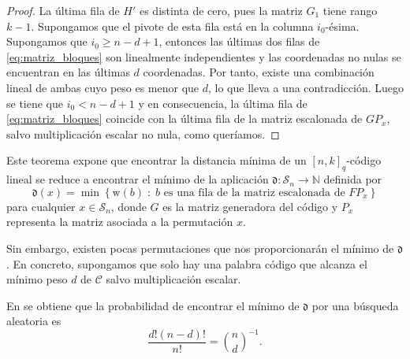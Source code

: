 \begin{proof}
    La última fila de $H'$ es distinta de cero, pues la matriz $G_1$ tiene rango $k-1$. Supongamos que el pivote de esta fila está en la columna $i_0$-ésima. Supongamos que $i_0 \geq n - d + 1$, entonces las últimas dos filas de \eqref{eq:matriz_bloques} son linealmente independientes y las coordenadas no nulas se encuentran en las últimas $d$ coordenadas. Por tanto, existe una combinación lineal de ambas cuyo peso es menor que $d$, lo que lleva a una contradicción. Luego se tiene que $i_0 < n - d + 1$ y en consecuencia, la última fila de \eqref{eq:matriz_bloques} coincide con la última fila de la matriz escalonada de $GP_x$, salvo multiplicación escalar no nula, como queríamos.
\end{proof}

Este teorema expone que encontrar la distancia mínima de un $[n, k]_q$-código lineal se reduce a encontrar el mínimo de la aplicación $\mathfrak d : \mathcal{S}_n \rightarrow \mathbb{N}$ definida por
\[
    \mathfrak d (x) = \min \left\{ \text{w}(b) \; : \; b \text{ es una fila de la matriz escalonada de } FP_x \right\}
\]
para cualquier $x \in \mathcal{S}_n$, donde $G$ es la matriz generadora del código y $P_x$ representa la matriz asociada a la permutación $x$.

Sin embargo, existen pocas permutaciones que nos proporcionarán el mínimo de $\mathfrak{d}$. En concreto, supongamos que solo hay una palabra código que alcanza el mínimo peso $d$ de $\mathcal{C}$ salvo multiplicación escalar.

En \cite{Cuellar_etal} se obtiene que la probabilidad de encontrar el mínimo de $\mathfrak{d}$ por una búsqueda aleatoria es
\[
    \frac{d! (n-d)!}{n!} = {n \choose d}^{-1}.
\]

